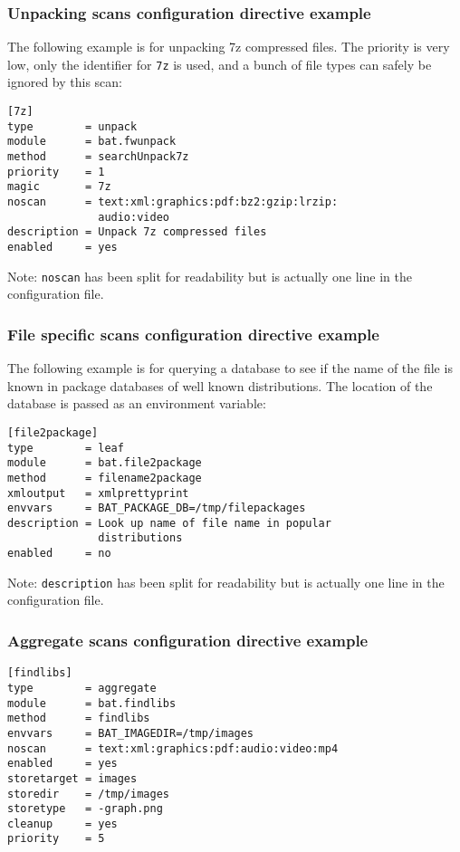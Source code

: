 \documentclass[11pt]{beamer}
\begin{document}
\begin{frame}[fragile]
\frametitle{Unpacking scans configuration directive example}

The following example is for unpacking 7z compressed files. The priority is very low, only the identifier for \texttt{7z} is used, and a bunch of file types can safely be ignored by this scan:

\begin{verbatim}
[7z]
type        = unpack
module      = bat.fwunpack
method      = searchUnpack7z
priority    = 1
magic       = 7z
noscan      = text:xml:graphics:pdf:bz2:gzip:lrzip:
              audio:video
description = Unpack 7z compressed files
enabled     = yes
\end{verbatim}

Note: \texttt{noscan} has been split for readability but is actually one line in the configuration file.
\end{frame}

\begin{frame}[fragile]
\frametitle{File specific scans configuration directive example}
The following example is for querying a database to see if the name of the file is known in package databases of well known distributions. The location of the database is passed as an environment variable:

\begin{verbatim}
[file2package]
type        = leaf
module      = bat.file2package
method      = filename2package
xmloutput   = xmlprettyprint
envvars     = BAT_PACKAGE_DB=/tmp/filepackages
description = Look up name of file name in popular
              distributions
enabled     = no
\end{verbatim}
Note: \texttt{description} has been split for readability but is actually one line in the configuration file.
\end{frame}

\begin{frame}[fragile]
\frametitle{Aggregate scans configuration directive example}
\begin{verbatim}
[findlibs]
type        = aggregate
module      = bat.findlibs
method      = findlibs
envvars     = BAT_IMAGEDIR=/tmp/images
noscan      = text:xml:graphics:pdf:audio:video:mp4
enabled     = yes
storetarget = images
storedir    = /tmp/images
storetype   = -graph.png
cleanup     = yes
priority    = 5
\end{verbatim}
\end{frame}
\end{document}
